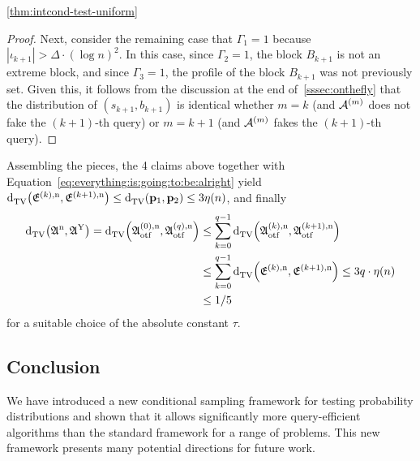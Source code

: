 \begin{proofof}{\cref{thm:intcond-test-uniform}}
\begin{proof}
Next, consider the remaining case that
$\Gamma_1=1$ because $|\iota_{k+1}| > \Delta \cdot (\log n)^2$.
In this case, since $\Gamma_2=1$, the block $B_{k+1}$ is not
an extreme block, and since $\Gamma_3=1$, the profile of the block
$B_{k+1}$ was not previously set.  Given this, it follows from the
discussion at the end of~\cref{sssec:onthefly} that the distribution of
$(s_{k+1},b_{k+1})$ is identical whether $m=k$ (and $\mathcal{A}^{(m)}$ does not fake
the $(k+1)$-th query) or $m=k+1$ (and $\mathcal{A}^{(m)}$ fakes the $(k+1)$-th query).
\end{proof}

Assembling the pieces, the 4 claims above together with Equation~\eqref{eq:everything:is:going:to:be:alright} yield ${\operatorname{d}_{\rm{TV}}^{}\!\left({ \mathfrak{E}^{(k),\rm n} ,  \mathfrak{E}^{(k+1),\rm n} }\right)} \leq {\operatorname{d}_{\rm{TV}}^{}\!\left({\ensuremath{\mathbf{p}}_1, \ensuremath{\mathbf{p}}_2}\right)} \leq 3\eta(n)$, and finally
\begin{align*}
     {\operatorname{d}_{\rm{TV}}^{}\!\left({ \mathfrak{A}^{\rm n} ,  \mathfrak{A}^{\rm Y} }\right)} = {\operatorname{d}_{\rm{TV}}^{}\!\left({ \mathfrak{A}^{(0), \rm n}_{\rm otf} ,  \mathfrak{A}^{(q), \rm n}_{\rm otf} }\right)}
      &\leq \sum_{k=0}^{q-1} {\operatorname{d}_{\rm{TV}}^{}\!\left({ \mathfrak{A}^{(k), \rm n}_{\rm otf} ,  \mathfrak{A}^{(k+1), \rm n}_{\rm otf} }\right)} \\
     &\leq \sum_{k=0}^{q-1} {\operatorname{d}_{\rm{TV}}^{}\!\left({ \mathfrak{E}^{(k),\rm n} ,  \mathfrak{E}^{(k+1),\rm n} }\right)}
     \leq 3q\cdot \eta(n) \\
     &\leq 1/5
\end{align*}
for a suitable choice of the absolute constant $\tau$.
\end{proofof}
\subsection{Conclusion}  \label{sec:conclusion}

We have introduced a new conditional sampling framework for testing probability
distributions and shown that it allows significantly more query-efficient
algorithms than the standard framework for a range of problems.
This new framework presents many potential directions for future work.

